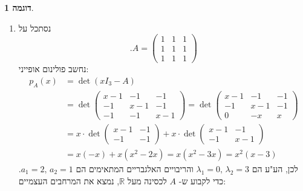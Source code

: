 \documentclass[12pt]{report}
\theoremstyle{plain}
\theoremstyle{definition}
\newtheorem{example}{דוגמה}[chapter]
\newcommand{\R}{\mathbb{R}}
\newcommand{\0}{\mathbf{0}}
\begin{document}
\begin{example}
\begin{enumerate}[label=\alph*.]
\item 
נסתכל על
$$
.A=\begin{pmatrix}
1 & 1 & 1\\
1 & 1 & 1\\
1 & 1 & 1
\end{pmatrix}
$$
נחשב פולינום אופייני:
$$
\begin{aligned}
p_A(x)&=\det(xI_3-A)\\
&=\det\begin{pmatrix}
x-1 & -1 & -1\\
-1 & x-1 & -1\\
-1 & -1 & x-1
\end{pmatrix}=\det\begin{pmatrix}
x-1 & -1 & -1\\
-1 & x-1 & -1\\
0 & -x & x
\end{pmatrix}\\
&=x\cdot\det\begin{pmatrix}
x-1 & -1\\
-1 & -1
\end{pmatrix}+x\cdot\det\begin{pmatrix}
x-1 & -1\\
-1 & x-1
\end{pmatrix}\\
&=x(-x)+x(x^2-2x)=x(x^2-3x)=x^2(x-3)
\end{aligned}
$$
לכן, הע"ע הם 
$\lambda_1=0,\,\lambda_2=3$
והריבויים האלגבריים המתאימים הם
$a_1=2,\,a_2=1$.
כדי לקבוע ש-
$A$
לכסינה מעל
$\R$,
נמצא את המרחבים העצמיים:


\end{enumerate}
\end{example}
\end{document}
